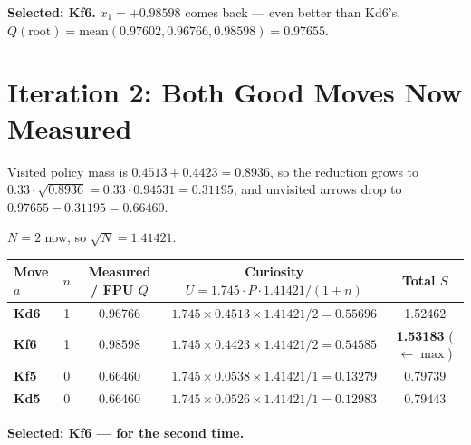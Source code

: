 \begin{realdata}
\textbf{Selected: Kf6.} $x_1 = +0.98598$ comes back --- even better than Kd6's.\\
$Q(\text{root}) = \text{mean}(0.97602, 0.96766, 0.98598) = 0.97655$.
\end{realdata}

\section{Iteration 2: Both Good Moves Now Measured}

Visited policy mass is $0.4513 + 0.4423 = 0.8936$, so the reduction grows to $0.33 \cdot \sqrt{0.8936} = 0.33 \cdot 0.94531 = 0.31195$, and unvisited arrows drop to $0.97655 - 0.31195 = 0.66460$.

$N = 2$ now, so $\sqrt{N} = 1.41421$.

\begin{center}
\small
\begin{tabular}{lcccc}
  \toprule
  Move $a$ & $n$ & Measured / FPU $Q$ & Curiosity $U = 1.745 \cdot P \cdot 1.41421 / (1+n)$ & Total $S$ \\
  \midrule
  \textbf{Kd6} & 1 & 0.96766 & $1.745 \times 0.4513 \times 1.41421 / 2 = 0.55696$ & 1.52462 \\
  \textbf{Kf6} & 1 & 0.98598 & $1.745 \times 0.4423 \times 1.41421 / 2 = 0.54585$ & \textbf{1.53183} \hfill ($\leftarrow \max$) \\
  \textbf{Kf5} & 0 & 0.66460 & $1.745 \times 0.0538 \times 1.41421 / 1 = 0.13279$ & 0.79739 \\
  \textbf{Kd5} & 0 & 0.66460 & $1.745 \times 0.0526 \times 1.41421 / 1 = 0.12983$ & 0.79443 \\
  \bottomrule
\end{tabular}
\end{center}

\begin{center}
\begin{minipage}{\linewidth}
\centering

\label{fig:iter2}
\end{minipage}
\end{center}

\begin{realdata}
\textbf{Selected: Kf6 --- for the second time.}
\end{realdata}

